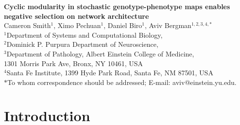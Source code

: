 



\let\ref\autoref


{}

\begin{center}
{\Large
\textbf{Cyclic modularity in stochastic genotype-phenotype maps enables negative selection on network architecture}
}
\\[.5cm]
Cameron Smith$^{1}$,
Ximo Pechuan$^{1}$,
Daniel Biro$^{1}$,
Aviv Bergman$^{1,2,3,4, \ast}$
\\[.5cm]
$^1$Department of Systems and Computational Biology,\\
$^2$Dominick P. Purpura Department of Neuroscience,\\
$^3$Department of Pathology, Albert Einstein College of Medicine,\\
1301 Morris Park Ave, Bronx, NY 10461, USA\\
$^4$Santa Fe Institute, 1399 Hyde Park Road, Santa Fe, NM 87501, USA
\\[.5cm]
$\ast$To whom correspondence should be addressed; E-mail: aviv@einstein.yu.edu.
\end{center}

{\begin{quote} \bf

\end{quote}}
%

\section{Introduction}


